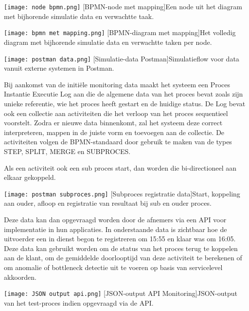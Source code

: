 \begin{center}
  \captionsetup{type=figure}
  \texttt{[image: node bpmn.png]}
  [BPMN-node met mapping]{Een node uit het diagram met bijhorende simulatie data en verwachtte taak.}
\end{center}
 
\begin{center}
  \captionsetup{type=figure}
  \texttt{[image: bpmn met mapping.png]}
  [BPMN-diagram met mapping]{Het volledig diagram met bijhorende simulatie data en verwachtte taken per node.}
\end{center}

\begin{center}
  \captionsetup{type=figure}
  \texttt{[image: postman data.png]}
  [Simulatie-data Postman]{Simulatieflow voor data vanuit externe systemen in Postman.}
\end{center}
Bij aankomst van de initiële monitoring data maakt het systeem een Proces Instantie Executie Log aan die de algemene data van het proces bevat zoals zijn unieke referentie, wie het proces heeft gestart en de huidige status. De Log bevat ook een collectie aan activiteiten die het verloop van het proces sequentieel voorstelt. Zodra er nieuwe data binnenkomt, zal het systeem deze correct interpreteren, mappen in de juiste vorm en toevoegen aan de collectie. De activiteiten volgen de BPMN-standaard door gebruik te maken van de types STEP, SPLIT, MERGE en SUBPROCES. \newline

Als een activiteit ook een sub proces start, dan worden die bi-directioneel aan elkaar gekoppeld. 
\begin{center}
  \captionsetup{type=figure}
  \texttt{[image: postman subproces.png]}
  [Subproces registratie data]{Start, koppeling aan ouder, afloop en registratie van resultaat bij sub en ouder proces.}
\end{center}
Deze data kan dan opgevraagd worden door de afnemers via een API voor implementatie in hun applicaties. In onderstaande data is zichtbaar hoe de uitvoerder een in dienst begon te registreren om 15:55 en klaar was om 16:05. Deze data kan gebruikt worden om de status van het proces terug te koppelen aan de klant, om de gemiddelde doorlooptijd van deze activiteit te berekenen of om anomalie of bottleneck detectie uit te voeren op basis van servicelevel akkoorden. 
\begin{center}
  \captionsetup{type=figure}
  \texttt{[image: JSON output api.png]}
  [JSON-output API Monitoring]{JSON-output van het test-proces indien opgevraagd via de API.}
\end{center}
 
